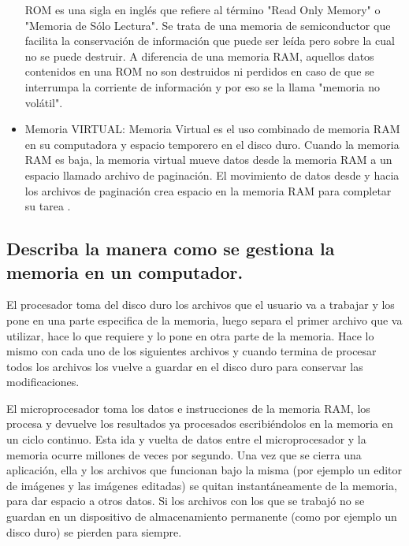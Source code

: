 \documentclass{article}
\begin{document}
\begin{itemize}
\vspace{0.5cm}
\noindent
ROM es una sigla en inglés que refiere al término "Read Only Memory" o "Memoria de Sólo Lectura". Se trata de una memoria de semiconductor que facilita la conservación de información que puede ser leída pero sobre la cual no se puede destruir. A diferencia de una memoria RAM, aquellos datos contenidos en una ROM no son destruidos ni perdidos en caso de que se interrumpa la corriente de información y por eso se la llama "memoria no volátil"\cite{ROM}.
    \item     Memoria VIRTUAL: Memoria Virtual es el uso combinado de memoria RAM en su computadora y espacio temporero en el disco duro. Cuando la memoria RAM es baja, la memoria virtual mueve datos desde la memoria RAM a un espacio llamado archivo de paginación. El movimiento de datos desde y hacia los archivos de paginación crea espacio en la memoria RAM para completar su tarea \cite{virtual}.
\end{itemize}

\subsection{Describa la manera como se gestiona la memoria en un computador.}

\vspace{0.5cm}
\noindent
El procesador toma del disco duro los archivos que el usuario va a trabajar y los pone en una parte especifica de la memoria, luego separa el primer archivo que va utilizar, hace lo que requiere y lo pone en otra parte de la memoria. Hace lo mismo con cada uno de los siguientes archivos y cuando termina de procesar todos los archivos los vuelve a guardar en el disco duro para conservar las modificaciones.

\vspace{0.5cm}
\noindent
El microprocesador toma los datos e instrucciones de la memoria RAM, los procesa y devuelve los resultados ya procesados escribiéndolos en la memoria en un ciclo continuo. Esta ida y vuelta de datos entre el microprocesador y la memoria ocurre millones de veces por segundo. Una vez que se cierra una aplicación, ella y los archivos que funcionan bajo la misma (por ejemplo un editor de imágenes y las imágenes editadas) se quitan instantáneamente de la memoria, para dar espacio a otros datos. Si los archivos con los que se trabajó no se guardan en un dispositivo de almacenamiento permanente (como por ejemplo un disco duro) se pierden para siempre\cite{taller}.
\end{document}
